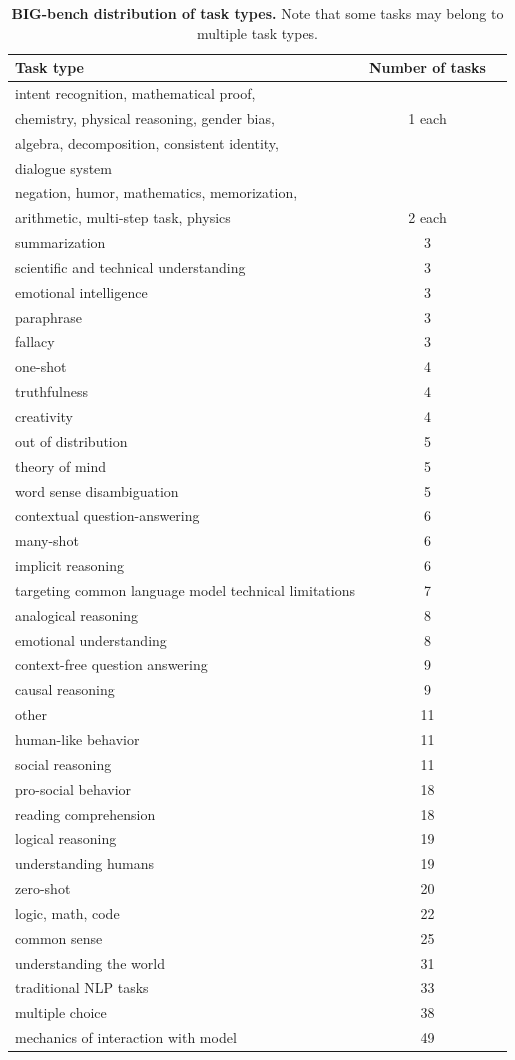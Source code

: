 \documentclass[11pt, a4paper, logo, internal, copyright, nonumbering]{deepmind}
\newcommand{\bigbench}{BIG-bench\xspace}
\begin{document}
{\small
\begin{table}[h!]
\centering
\begin{tabular}{lcc}
\toprule
Task type & Number of tasks \\
\hline
intent recognition, mathematical proof, &\\
chemistry, physical reasoning, gender bias, & 1 each \\
algebra, decomposition, consistent identity, &\\
dialogue system &\\
\hline
negation, humor, mathematics, memorization, &\\
arithmetic, multi-step task, physics & 2 each \\
\hline
summarization & 3 \\
scientific and technical understanding & 3 \\
emotional intelligence & 3 \\
paraphrase & 3 \\
fallacy & 3 \\
one-shot & 4 \\
truthfulness & 4 \\
creativity & 4 \\
out of distribution & 5 \\
theory of mind & 5 \\
word sense disambiguation & 5 \\
contextual question-answering & 6 \\
many-shot & 6 \\
implicit reasoning & 6 \\
targeting common language model technical limitations & 7 \\
analogical reasoning & 8 \\
emotional understanding & 8 \\
context-free question answering & 9 \\
causal reasoning & 9 \\
other & 11 \\
human-like behavior & 11 \\
social reasoning & 11 \\
pro-social behavior & 18 \\
reading comprehension & 18 \\
logical reasoning & 19 \\
understanding humans & 19 \\
zero-shot & 20 \\
logic, math, code & 22 \\
common sense & 25 \\
understanding the world & 31 \\
traditional NLP tasks & 33 \\
multiple choice & 38 \\
mechanics of interaction with model & 49 \\
\bottomrule
\end{tabular}
\caption{\textbf{\bigbench distribution of task types.} Note that some tasks may belong to multiple task types.}
\label{tab:bigbench_task_dist}
\end{table}
}
\end{document}
